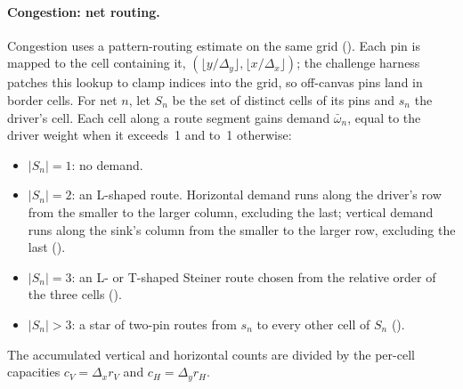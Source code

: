 \paragraph{Congestion: net routing.} Congestion uses a pattern-routing estimate on
the same grid (). Each pin is mapped to the cell containing it,
$(\lfloor y/\Delta_y\rfloor,\lfloor x/\Delta_x\rfloor)$; the challenge harness patches
this lookup to clamp indices into the grid, so off-canvas pins land in border cells.
For net $n$, let $S_n$ be the set of distinct cells of its pins and $s_n$ the
driver's cell. Each cell along a route segment gains demand $\bar\omega_n$, equal to
the driver weight when it exceeds~1 and to~1 otherwise:
\begin{itemize}
  \item $|S_n|=1$: no demand.
  \item $|S_n|=2$: an L-shaped route. Horizontal demand runs along the driver's row
        from the smaller to the larger column, excluding the last; vertical demand
        runs along the sink's column from the smaller to the larger row, excluding
        the last ().
  \item $|S_n|=3$: an L- or T-shaped Steiner route chosen from the relative order of
        the three cells ().
  \item $|S_n|>3$: a star of two-pin routes from $s_n$ to every other cell of
        $S_n$ ().
\end{itemize}
The accumulated vertical and horizontal counts are divided by the per-cell
capacities $c_V=\Delta_x r_V$ and $c_H=\Delta_y r_H$.

